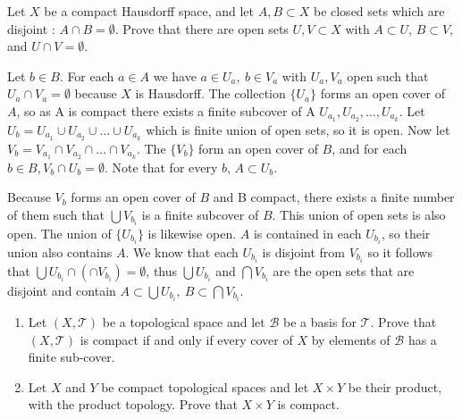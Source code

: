 \documentclass{jhwhw}
\newcommand{\T}{{\mathcal T}}
\newcommand{\B}{{\mathcal B}}
\begin{document}
\problem{}%
Let $X$ be a compact Hausdorff space, and let $A,B\subset X$ be closed sets which are  disjoint : $A\cap B =\emptyset$.  Prove that there are open sets $U,V\subset X$ with $A\subset U$, $B\subset V$, and $U\cap V = \emptyset$. 

\solution{}
Let $b \in B$. For each $a \in A$ we have $a \in U_a ,\ b \in V_a $ with $U_a, V_a$ open such that $U_a \cap V_a = \emptyset$ because $X$ is Hausdorff. The collection $\{U_a\}$ forms an open cover of $A$, so as A is compact there exists a finite subcover of A $U_{a_1}, U_{a_2}, \ldots, U_{a_k}$. Let $U_b = U_{a_1} \cup U_{a_2} \cup \dots \cup U_{a_k}$ which is finite union of open sets, so it is open. Now let $V_b = V_{a_1} \cap V_{a_2} \cap \dots \cap V_{a_k}$. The $\{V_b\}$ form an open cover of $B$, and for each $b \in B, V_b \cap U_b = \emptyset$.  Note that for every $b$, $A \subset U_b$. 

Because $V_b$ forms an open cover of $B$ and B compact, there exists a finite number of them such that $ \bigcup V_{b_i}$ is a finite subcover of $B$. This union of open sets is also open. The union of $\{U_{b_i}\}$ is likewise open. $A$ is contained in each $U_{b_i}$, so their union also contains $A$. We know that each $U_{b_i}$ is disjoint from $V_{b_i}$ so it follows that $\bigcup U_{b_i} \cap \left( \cap V_{b_i} \right) = \emptyset$, thus $\bigcup U_{b_i}$ and $\bigcap V_{b_i}$ are the open sets that are disjoint and contain $A\subset\bigcup U_{b_i} ,\ B\subset\bigcap V_{b_i} $.  



\problem{}%
\begin{enumerate}
	\item Let $(X,\T)$ be a topological space and let $\B$ be a basis for $\T$.  Prove that $(X,\T)$ is compact if and only if every cover of $X$ by elements of $\B$ has a finite sub-cover. 
	\item Let $X$ and $Y$ be compact topological spaces and let $X\times Y$ be their product, with the product topology.   Prove that $X\times Y$ is compact.
	
\end{enumerate}
\solution{}
\part{}%
\end{document}
